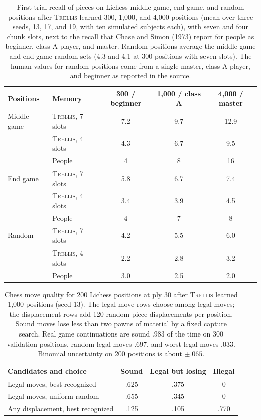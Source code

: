 \documentclass[11pt,letterpaper]{article}
\newcommand{\trellis}{\textsc{Trellis}}
\begin{document}
\begin{table}[h]
\caption{First-trial recall of pieces on Lichess middle-game, end-game, and random positions after \trellis{} learned 300, 1,000, and 4,000 positions (mean over three seeds, 13, 17, and 19, with ten simulated subjects each), with seven and four chunk slots,
next to the recall that Chase and Simon (1973) report for people as beginner, class A player, and master. Random positions average the middle-game and end-game random sets (4.3 and 4.1 at 300 positions with seven slots).
The human values for random positions come from a single master, class A player, and beginner as reported in the source.}
\label{tab:cs}
\begin{center}
\small
\begin{tabular}{llccc}
\toprule
Positions & Memory & 300 / beginner & 1,000 / class A & 4,000 / master \\
\midrule
Middle game & \trellis{}, 7 slots & 7.2 & 9.7 & 12.9 \\
 & \trellis{}, 4 slots & 4.3 & 6.7 & 9.5 \\
 & People & 4 & 8 & 16 \\
End game & \trellis{}, 7 slots & 5.8 & 6.7 & 7.4 \\
 & \trellis{}, 4 slots & 3.4 & 3.9 & 4.5 \\
 & People & 4 & 7 & 8 \\
Random & \trellis{}, 7 slots & 4.2 & 5.5 & 6.0 \\
 & \trellis{}, 4 slots & 2.2 & 2.8 & 3.2 \\
 & People & 3.0 & 2.5 & 2.0 \\
\bottomrule
\end{tabular}
\end{center}
\end{table}

\begin{table}[h]
\caption{Chess move quality for 200 Lichess positions at ply 30 after \trellis{} learned 1,000 positions (seed 13). The legal-move rows choose among legal moves; the displacement rows add 120 random piece displacements per position.
Sound moves lose less than two pawns of material by a fixed capture search. Real game continuations are sound .983 of the time on 300 validation positions, random legal moves .697, and worst legal moves .033.
Binomial uncertainty on 200 positions is about $\pm.065$.}
\label{tab:chessmoves}
\begin{center}
\small
\begin{tabular}{lccc}
\toprule
Candidates and choice & Sound & Legal but losing & Illegal \\
\midrule
Legal moves, best recognized & .625 & .375 & 0 \\
Legal moves, uniform random & .655 & .345 & 0 \\
Any displacement, best recognized & .125 & .105 & .770 \\
\bottomrule
\end{tabular}
\end{center}
\end{table}
\end{document}
